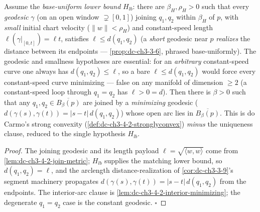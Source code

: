 \begin{lemma}
  \label{lem:dc-ch3-4-2-minimizing-interior}
  \leanok
  Assume the \emph{base-uniform lower bound} $H_{lb}$: there are $\beta_H,\rho_H>0$ such that every
  \emph{geodesic} $\gamma$ (on an open window $\supsetneq[0,1]$) joining $q_1,q_2$ within $\beta_H$ of
  $p$, with \emph{small} initial chart velocity ($\|w\|<\rho_H$) and constant-speed length
  $\ell(\gamma|_{[0,t]})=\ell t$, satisfies $\ell\le d(q_1,q_2)$ (a \emph{short} geodesic near $p$
  \emph{realizes} the distance between its endpoints --- \cref{prop:dc-ch3-3-6}, phrased
  base-uniformly). The geodesic and smallness hypotheses are essential: for an \emph{arbitrary}
  constant-speed curve one always has $d(q_1,q_2)\le\ell$, so a bare $\ell\le d(q_1,q_2)$ would force
  every constant-speed curve minimizing --- false on any manifold of dimension $\ge2$ (a constant-speed
  loop through $q_1=q_2$ has $\ell>0=d$). Then there is
  $\beta>0$ such that any $q_1,q_2\in\overline{B_\beta(p)}$ are joined by a \emph{minimizing} geodesic
  ($d(\gamma(s),\gamma(t))=|s-t|\,d(q_1,q_2)$) whose open arc lies in $\overline{B_\beta(p)}$. This is
  do Carmo's strong convexity (\cref{def:dc-ch3-4-2-stronglyconvex}) \emph{minus} the uniqueness
  clause, reduced to the single hypothesis $H_{lb}$.
\end{lemma}
\begin{proof}
  \leanok
  The joining geodesic and its length payload $\ell=\sqrt{\langle w,w\rangle}$ come from
  \cref{lem:dc-ch3-4-2-join-metric}; $H_{lb}$ supplies the matching lower bound, so $d(q_1,q_2)=\ell$,
  and the arclength distance-realization of \cref{cor:dc-ch3-3-9}'s segment machinery propagates
  $d(\gamma(s),\gamma(t))=|s-t|\,d(q_1,q_2)$ from the endpoints. The interior-arc clause is
  \cref{lem:dc-ch3-4-2-interior-minimizing}; the degenerate $q_1=q_2$ case is the constant geodesic.
  $\square$
\end{proof}

